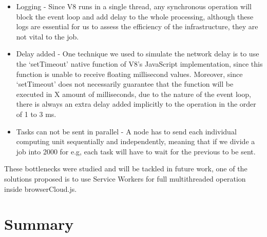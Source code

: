 \begin{itemize}
  \item Logging - Since V8 runs in a single thread, any synchronous operation will block the event loop and add delay to the whole processing, although these logs are essential for us to assess the efficiency of the infrastructure, they are not vital to the job.
  \item Delay added - One technique we used to simulate the network delay is to use the `setTimeout' native function of V8's JavaScript implementation, since this function is unable to receive floating millisecond values. Moreover, since `setTimeout' does not necessarily guarantee that the function will be executed in X amount of milliseconds, due to the nature of the event loop, there is always an extra delay added implicitly to the operation in the order of 1 to 3 ms.
  \item Tasks can not be sent in parallel - A node has to send each individual computing unit sequentially and independently, meaning that if we divide a job into 2000 for e.g, each task will have to wait for the previous to be sent.
\end{itemize}

These bottlenecks were studied and will be tackled in future work, one of the solutions proposed is to use Service Workers\cite{ServiceWorkers} for full multithreaded operation inside browserCloud.js.


\section*{Summary}
